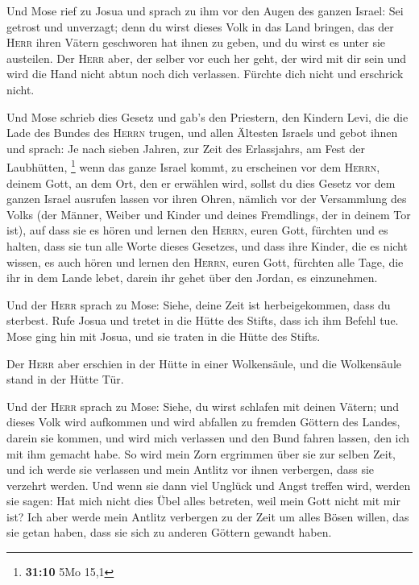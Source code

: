  Und Mose rief zu Josua und sprach zu ihm vor den Augen
des ganzen Israel: Sei getrost und unverzagt; denn du wirst dieses Volk
in das Land bringen, das der \textsc{Herr} ihren Vätern geschworen hat
ihnen zu geben, und du wirst es unter sie austeilen.  Der
\textsc{Herr} aber, der selber vor euch her geht, der wird mit dir sein
und wird die Hand nicht abtun noch dich verlassen. Fürchte dich nicht
und erschrick nicht.

 Und Mose schrieb dies Gesetz und gab's den Priestern, den
Kindern Levi, die die Lade des Bundes des \textsc{Herrn} trugen, und
allen Ältesten Israels  und gebot ihnen und sprach: Je
nach sieben Jahren, zur Zeit des Erlassjahrs, am Fest der Laubhütten,
\footnote{\textbf{31:10} 5Mo 15,1}  wenn das ganze Israel
kommt, zu erscheinen vor dem \textsc{Herrn}, deinem Gott, an dem Ort,
den er erwählen wird, sollst du dies Gesetz vor dem ganzen Israel
ausrufen lassen vor ihren Ohren,  nämlich vor der
Versammlung des Volks (der Männer, Weiber und Kinder und deines
Fremdlings, der in deinem Tor ist), auf dass sie es hören und lernen den
\textsc{Herrn}, euren Gott, fürchten und es halten, dass sie tun alle
Worte dieses Gesetzes,  und dass ihre Kinder, die es
nicht wissen, es auch hören und lernen den \textsc{Herrn}, euren Gott,
fürchten alle Tage, die ihr in dem Lande lebet, darein ihr gehet über
den Jordan, es einzunehmen.

 Und der \textsc{Herr} sprach zu Mose: Siehe, deine Zeit
ist herbeigekommen, dass du sterbest. Rufe Josua und tretet in die Hütte
des Stifts, dass ich ihm Befehl tue. Mose ging hin mit Josua, und sie
traten in die Hütte des Stifts.

 Der \textsc{Herr} aber erschien in der Hütte in einer
Wolkensäule, und die Wolkensäule stand in der Hütte Tür.

 Und der \textsc{Herr} sprach zu Mose: Siehe, du wirst
schlafen mit deinen Vätern; und dieses Volk wird aufkommen und wird
abfallen zu fremden Göttern des Landes, darein sie kommen, und wird mich
verlassen und den Bund fahren lassen, den ich mit ihm gemacht habe.
 So wird mein Zorn ergrimmen über sie zur selben Zeit,
und ich werde sie verlassen und mein Antlitz vor ihnen verbergen, dass
sie verzehrt werden. Und wenn sie dann viel Unglück und Angst treffen
wird, werden sie sagen: Hat mich nicht dies Übel alles betreten, weil
mein Gott nicht mit mir ist?  Ich aber werde mein Antlitz
verbergen zu der Zeit um alles Bösen willen, das sie getan haben, dass
sie sich zu anderen Göttern gewandt haben.

